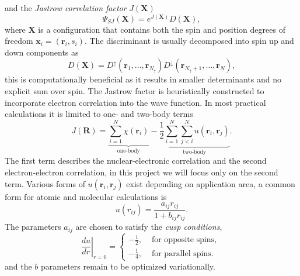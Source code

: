 \documentclass[final,3p,times,twocolumn]{elsarticle}
\begin{document}
	and the \emph{Jastrow correlation factor} $J(\mathbf{X})$
	\begin{equation}
		\Psi_{SJ}(\mathbf{X})=e^{J(\mathbf{X})} D(\mathbf{X}),
	\end{equation}
	where $\mathbf{X}$ is a configuration that contains both the spin and position degrees of freedom $\mathbf{x}_i = (\mathbf{r}_i, s_i)$. The discriminant is usually decomposed into spin up and down components as
	\begin{equation}
		D(\mathbf{X}) = D^{\uparrow}\left(\mathbf{r}_{1}, \ldots, \mathbf{r}_{N_{\uparrow}}\right) D^{\downarrow}\left(\mathbf{r}_{N_{\uparrow}+1}, \ldots, \mathbf{r}_{N}\right),
	\end{equation}
	this is computationally beneficial as it results in smaller determinants and no explicit sum over spin.
	The Jastrow factor is heuristically constructed to incorporate electron correlation into the wave function. In most practical calculations it is limited to one- and two-body terms~\cite{foulkes2001quantum}
	\begin{equation}
		J(\mathbf{R})=
		\underbrace{\sum_{i=1}^{N} \chi\left(\mathbf{r}_{i}\right)}_{\text{one-body}}
		-
		\underbrace{\frac{1}{2} \sum_{i=1}^{N} \sum_{j<i}^{N} u\left(\mathbf{r}_{i}, \mathbf{r}_{j}\right)}_{\text{two-body}}.
	\end{equation}
	The first term describes the nuclear-electronic correlation and the second electron-electron correlation, in this project we will focus only on the second term. 
	Various forms of $u(\mathbf{r}_{i}, \mathbf{r}_{j})$ exist depending on application area, a common form for atomic and molecular calculations is
	\begin{equation}
		u(r_{ij})=\frac{a_{ij} r_{ij}}{1+b_{ij} r_{ij}}.
	\end{equation}
	The parameters $a_{ij}$ are chosen to satisfy the \emph{cusp conditions},  
	\begin{equation}
		\left.\frac{d u}{d r}\right|_{r=0}=\left\{\begin{array}{cl}-\frac{1}{2}, & \text { for opposite spins, } \\ -\frac{1}{4}, & \text { for parallel spins. }\end{array}\right.
	\end{equation}
	and the $b$ parameters remain to be optimized variationally. 
	
\end{document}
